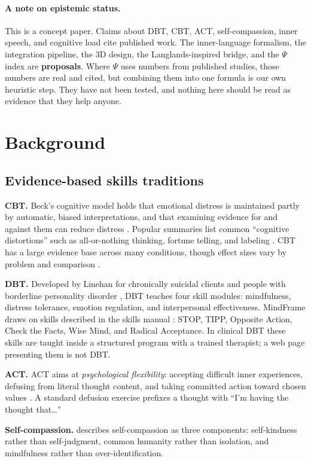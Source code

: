 \documentclass[11pt]{article}
\begin{document}
\paragraph{A note on epistemic status.} This is a concept paper. Claims about DBT, CBT, ACT, self-compassion, inner speech, and cognitive load cite published work. The inner-language formalism, the integration pipeline, the 3D design, the Langlands-inspired bridge, and the $\Psi$ index are \textbf{proposals}. Where $\Psi$ uses numbers from published studies, those numbers are real and cited, but combining them into one formula is our own heuristic step. They have not been tested, and nothing here should be read as evidence that they help anyone.

\section{Background}
\subsection{Evidence-based skills traditions}
\textbf{CBT.} Beck's cognitive model holds that emotional distress is maintained partly by automatic, biased interpretations, and that examining evidence for and against them can reduce distress \citep{beck1976,beck1979}. Popular summaries list common ``cognitive distortions'' such as all-or-nothing thinking, fortune telling, and labeling \citep{burns1980}. CBT has a large evidence base across many conditions, though effect sizes vary by problem and comparison \citep{hofmann2012}.

\textbf{DBT.} Developed by Linehan for chronically suicidal clients and people with borderline personality disorder \citep{linehan1993}, DBT teaches four skill modules: mindfulness, distress tolerance, emotion regulation, and interpersonal effectiveness. MindFrame draws on skills described in the skills manual \citep{linehan2015}: STOP, TIPP, Opposite Action, Check the Facts, Wise Mind, and Radical Acceptance. In clinical DBT these skills are taught inside a structured program with a trained therapist; a web page presenting them is not DBT.

\textbf{ACT.} ACT aims at \emph{psychological flexibility}: accepting difficult inner experiences, defusing from literal thought content, and taking committed action toward chosen values \citep{hayes2012}. A standard defusion exercise prefixes a thought with ``I'm having the thought that\ldots''

\textbf{Self-compassion.} \citet{neff2003} describes self-compassion as three components: self-kindness rather than self-judgment, common humanity rather than isolation, and mindfulness rather than over-identification.
\end{document}
